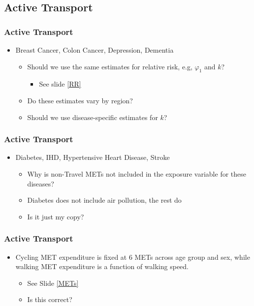 \documentclass[handout,13pt,compress,c]{beamer}
\newcommand{\bi}{\begin{itemize}}
\newcommand{\ei}{\end{itemize}}
\begin{document}
\subsection{Active Transport}
\begin{frame}[fragile]
\frametitle{Active Transport}
\bi
\item Breast Cancer, Colon Cancer, Depression, Dementia
\bi\item Should we use the same estimates for relative risk, e.g, $\varphi_1$ and $k$?
\bi\item See slide \ref{RR}\ei
\item Do these estimates vary by region?
\item Should we use disease-specific estimates for $k$?
\ei 
\ei
\end{frame}
\begin{frame}[fragile]
\frametitle{Active Transport}
\bi
\item Diabetes, IHD, Hypertensive Heart Disease, Stroke
\bi\item Why is non-Travel METs not included in the exposure variable
for these diseases?
\item Diabetes does not include air pollution, the rest do
\item Is it just my copy?
\ei
\ei
\end{frame}
\begin{frame}[fragile]
\frametitle{Active Transport}
\bi\item Cycling MET expenditure is fixed at 6 METs across age
group and sex, while walking MET expenditure is a function of walking
speed.
\bi\item See Slide \ref{METs} \item Is this correct?\ei
\ei
\end{frame}
\end{document}
